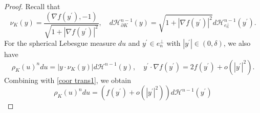 \documentclass[10pt,a4paper]{amsart}
\newcommand{\tH}{\mathcal{H}}
\begin{document}
\begin{proof}

    Recall that
    \begin{equation}\label{coor trans1}
        \nu_K(y)=\frac{(\nabla f(y^{\prime}),-1)}{\sqrt{1+|\nabla f(y^{\prime})|^2}},\quad d\tH^{n-1}_{\partial K}(y)=\sqrt{1+|\nabla f(y^{\prime})|^2}d\tH^{n-1}_{e_n^{\perp}}(y^{\prime}).
    \end{equation}
    For the spherical Lebesgue measure $du$ and $y^{\prime}\in e_n^{\perp}$ with $|y^{\prime}|\in(0,\delta)$, we also have
    \begin{equation*}
        \rho_K(u)^ndu=| y\cdot \nu_K(y) |d\tH^{n-1}(y),\quad y^{\prime}\cdot  \nabla f(y^{\prime})=2f(y^{\prime})+o(|y^{\prime}|^2).
    \end{equation*}
    Combining with \eqref{coor trans1}, we obtain
    \begin{equation}\label{coor trans2}
        \rho_K(u)^ndu=(f(y^{\prime})+o(|y^{\prime}|^2))d\tH^{n-1}(y^{\prime})
    \end{equation}


\end{proof}
\end{document}
